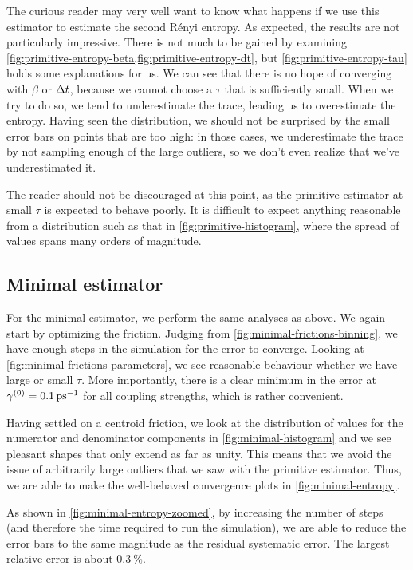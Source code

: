 The curious reader may very well want to know what happens if we use this estimator to estimate the second Rényi entropy.
As expected, the results are not particularly impressive.
There is not much to be gained by examining \cref{fig:primitive-entropy-beta,fig:primitive-entropy-dt}, but \cref{fig:primitive-entropy-tau} holds some explanations for us.
We can see that there is no hope of converging with $\beta$ or $\Delta t$, because we cannot choose a $\tau$ that is sufficiently small.
When we try to do so, we tend to underestimate the trace, leading us to overestimate the entropy.
Having seen the distribution, we should not be surprised by the small error bars on points that are too high: in those cases, we underestimate the trace by not sampling enough of the large outliers, so we don't even realize that we've underestimated it.

The reader should not be discouraged at this point, as the primitive estimator at small $\tau$ is expected to behave poorly.
It is difficult to expect anything reasonable from a distribution such as that in \cref{fig:primitive-histogram}, where the spread of values spans many orders of magnitude.


\subsection{Minimal estimator}

For the minimal estimator, we perform the same analyses as above.
We again start by optimizing the friction.
Judging from \cref{fig:minimal-frictions-binning}, we have enough steps in the simulation for the error to converge.
Looking at \cref{fig:minimal-frictions-parameters}, we see reasonable behaviour whether we have large or small $\tau$.
More importantly, there is a clear minimum in the error at $\gamma\bead{0} = \SI{0.1}{\per\pico\second}$ for all coupling strengths, which is rather convenient.

Having settled on a centroid friction, we look at the distribution of values for the numerator and denominator components in \cref{fig:minimal-histogram} and we see pleasant shapes that only extend as far as unity.
This means that we avoid the issue of arbitrarily large outliers that we saw with the primitive estimator.
Thus, we are able to make the well-behaved convergence plots in \cref{fig:minimal-entropy}.

As shown in \cref{fig:minimal-entropy-zoomed}, by increasing the number of steps (and therefore the time required to run the simulation), we are able to reduce the error bars to the same magnitude as the residual systematic error.
The largest relative error is about $\SI{0.3}{\percent}$.

